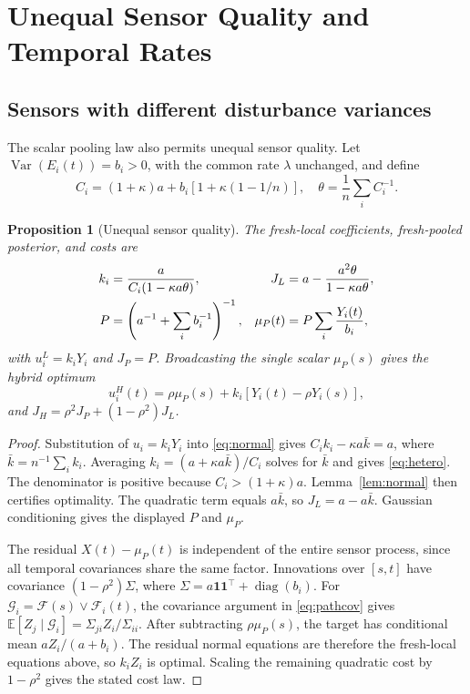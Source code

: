 \documentclass[letterpaper,10pt,conference]{ieeeconf}
\newtheorem{proposition}{Proposition}
\newcommand{\E}{\mathbb E}
\newcommand{\Var}{\operatorname{Var}}
\begin{document}
\section{Unequal Sensor Quality and Temporal Rates}
\subsection{Sensors with different disturbance variances}
The scalar pooling law also permits unequal sensor quality. Let $\Var(E_i(t))=b_i>0$, with the common rate $\lambda$ unchanged, and define
\begin{equation}
 C_i=(1+\kappa)a+b_i[1+\kappa(1-1/n)],
 \quad \theta=\frac1n\sum_i C_i^{-1}.\label{eq:heterodefs}
\end{equation}
\begin{proposition}[Unequal sensor quality]\label{prop:hetero}
The fresh-local coefficients, fresh-pooled posterior, and costs are
\begin{align}
 k_i&=\frac{a}{C_i(1-\kappa a\theta)},&
 J_L&=a-\frac{a^2\theta}{1-\kappa a\theta},\notag\\
 P&=\left(a^{-1}+\sum_i b_i^{-1}\right)^{-1},&
 \mu_P(t)&=P\sum_i\frac{Y_i(t)}{b_i},\label{eq:hetero}
\end{align}
with $u_i^L=k_iY_i$ and $J_P=P$. Broadcasting the single scalar $\mu_P(s)$ gives the hybrid optimum
\begin{equation}
 u_i^H(t)=\rho\mu_P(s)+k_i[Y_i(t)-\rho Y_i(s)],\label{eq:heteropolicy}
\end{equation}
and $J_H=\rho^2J_P+(1-\rho^2)J_L$.
\end{proposition}
\begin{proof}
Substitution of $u_i=k_iY_i$ into \eqref{eq:normal} gives $C_i k_i-\kappa a\bar k=a$, where $\bar k=n^{-1}\sum_i k_i$. Averaging $k_i=(a+\kappa a\bar k)/C_i$ solves for $\bar k$ and gives \eqref{eq:hetero}. The denominator is positive because $C_i>(1+\kappa)a$. Lemma~\ref{lem:normal} then certifies optimality. The quadratic term equals $a\bar k$, so $J_L=a-a\bar k$. Gaussian conditioning gives the displayed $P$ and $\mu_P$.

The residual $X(t)-\mu_P(t)$ is independent of the entire sensor process, since all temporal covariances share the same factor. Innovations over $[s,t]$ have covariance $(1-\rho^2)\Sigma$, where $\Sigma=a\mathbf1\mathbf1^\top+\operatorname{diag}(b_i)$. For $\mathcal G_i=\mathcal F(s)\vee\mathcal F_i(t)$, the covariance argument in \eqref{eq:pathcov} gives $\E[Z_j\mid\mathcal G_i]=\Sigma_{ji}Z_i/\Sigma_{ii}$. After subtracting $\rho\mu_P(s)$, the target has conditional mean $aZ_i/(a+b_i)$. The residual normal equations are therefore the fresh-local equations above, so $k_iZ_i$ is optimal. Scaling the remaining quadratic cost by $1-\rho^2$ gives the stated cost law.
\end{proof}
\end{document}
